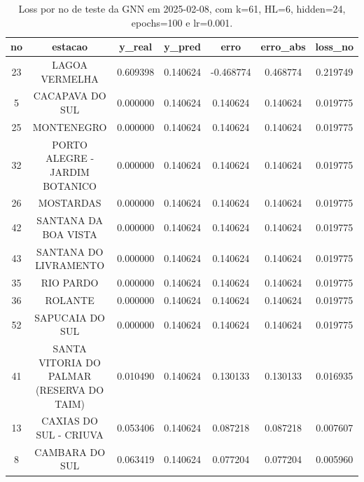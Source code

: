 \begin{table}[h]
\centering
\caption{Loss por no de teste da GNN em 2025-02-08, com k=61, HL=6, hidden=24, epochs=100 e lr=0.001.}
\label{tab:gnn_loss_k61_hl6_h24_e100_d20250208}
\begin{tabular}{ccccccc}
\toprule
no & estacao & y\_real & y\_pred & erro & erro\_abs & loss\_no \\
\midrule
23 & LAGOA VERMELHA & 0.609398 & 0.140624 & -0.468774 & 0.468774 & 0.219749 \\
5 & CACAPAVA DO SUL & 0.000000 & 0.140624 & 0.140624 & 0.140624 & 0.019775 \\
25 & MONTENEGRO & 0.000000 & 0.140624 & 0.140624 & 0.140624 & 0.019775 \\
32 & PORTO ALEGRE - JARDIM BOTANICO & 0.000000 & 0.140624 & 0.140624 & 0.140624 & 0.019775 \\
26 & MOSTARDAS & 0.000000 & 0.140624 & 0.140624 & 0.140624 & 0.019775 \\
42 & SANTANA DA BOA VISTA & 0.000000 & 0.140624 & 0.140624 & 0.140624 & 0.019775 \\
43 & SANTANA DO LIVRAMENTO & 0.000000 & 0.140624 & 0.140624 & 0.140624 & 0.019775 \\
35 & RIO PARDO & 0.000000 & 0.140624 & 0.140624 & 0.140624 & 0.019775 \\
36 & ROLANTE & 0.000000 & 0.140624 & 0.140624 & 0.140624 & 0.019775 \\
52 & SAPUCAIA DO SUL & 0.000000 & 0.140624 & 0.140624 & 0.140624 & 0.019775 \\
41 & SANTA VITORIA DO PALMAR (RESERVA DO TAIM) & 0.010490 & 0.140624 & 0.130133 & 0.130133 & 0.016935 \\
13 & CAXIAS DO SUL - CRIUVA & 0.053406 & 0.140624 & 0.087218 & 0.087218 & 0.007607 \\
8 & CAMBARA DO SUL & 0.063419 & 0.140624 & 0.077204 & 0.077204 & 0.005960 \\
\bottomrule
\end{tabular}
\end{table}
